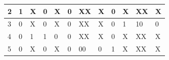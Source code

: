 \documentclass[12pt, letterpaper]{article}
\begin{document}
\begin{table}[H]
\begin{tabular}{|l|l|l|l|l|l|l|l|l|l|l|l|}
    2     & 1                                                 & X                                                    & 0                                                  & X                                                   & 0                                                 & XX                                                   & X                                                     & 0                                                  & X                                                    & XX                                                   & X                                                  \\ \hline
    3     & 0                                                 & X                                                    & 0                                                  & X                                                   & 0                                                 & XX                                                   & X                                                     & 0                                                  & 1                                                    & 10                                                   & 0                                                  \\ \hline
    4     & 0                                                 & 1                                                    & 1                                                  & 0                                                   & 0                                                 & XX                                                   & X                                                     & 0                                                  & X                                                    & XX                                                   & X                                                  \\ \hline
    5     & 0                                                 & X                                                    & 0                                                  & X                                                   & 0                                                 & 00                                                   & 0                                                     & 1                                                  & X                                                    & XX                                                   & X                                                  \\ \hline

\end{tabular}
\end{table}
\end{document}
